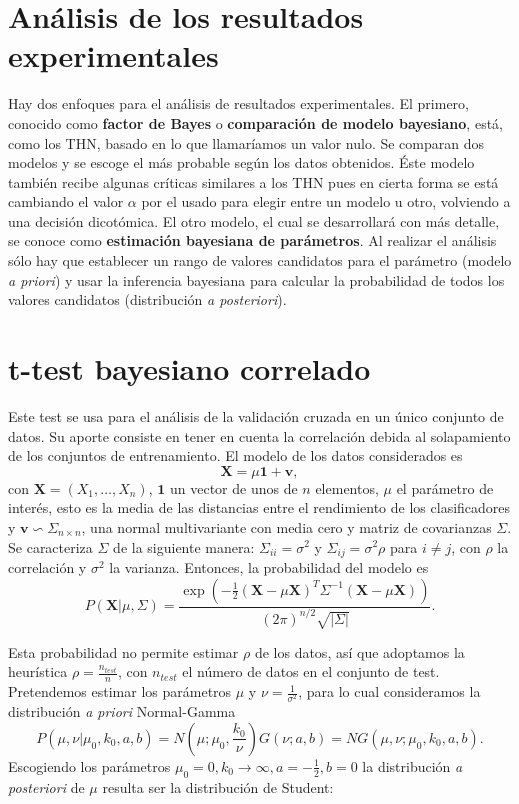 \section{Análisis de los resultados experimentales}

	Hay dos enfoques para el análisis de resultados 
experimentales. El primero, conocido como \textbf{factor de 
Bayes} o \textbf{comparación de modelo bayesiano}, está, como 
los THN, basado en lo que llamaríamos un valor nulo. Se 
comparan dos modelos y se escoge el más probable según los 
datos obtenidos. Éste modelo también recibe algunas críticas
similares a los THN pues en cierta forma se está cambiando el
valor $\alpha$ por el usado para elegir entre un modelo u 
otro, volviendo a una decisión dicotómica. El otro modelo, el 
cual se desarrollará con más detalle, se conoce como 
\textbf{estimación bayesiana de parámetros}. Al realizar
el análisis sólo hay que establecer un rango de valores 
candidatos para el parámetro (modelo \textit{a priori}) 
y usar la inferencia bayesiana para calcular la probabilidad
de todos los valores candidatos (distribución \textit{a 
posteriori}).\\

\section{t-test bayesiano correlado}
	\label{ssec:bayes-ttest}
	Este test se usa para el análisis de la validación
cruzada en un único conjunto de datos. Su aporte consiste en 
tener en cuenta la correlación debida al solapamiento de los 
conjuntos de entrenamiento. El modelo de los datos 
considerados es
	\[ \mathbf{X} = \mu \mathbf{1} + \mathbf{v}, \]
	con $\mathbf{X} = (X_1, \dots, X_n)$, $\mathbf{1}$ un 
vector de unos de $n$ elementos, $\mu$ el parámetro de
interés, esto es la media de las distancias entre el 
rendimiento de los clasificadores y $\mathbf{v} \backsim 
\Sigma_{n \times n}$, una normal multivariante con
media cero y matriz de covarianzas $\Sigma$. Se caracteriza
$\Sigma$ de la siguiente manera: $\Sigma_{ii} = \sigma^2$
y $\Sigma_{ij} = \sigma^2 \rho$ para $i \neq j$, con $\rho$
la correlación y $\sigma^2$ la varianza. Entonces,
la probabilidad del modelo es 
	\[ 
		P(\mathbf{X} | \mu, \Sigma) = 
		\frac{\exp\left(
				-\frac{1}{2}
				(\mathbf{X}-\mu\mathbf{X})^T
				\Sigma^{-1}
				(\mathbf{X}-\mu\mathbf{X})
			\right)}
		{(2\pi)^{n/2} \sqrt{|\Sigma|}}.
	\]

	Esta probabilidad no permite estimar $\rho$ de los datos, 
así que adoptamos la heurística $\rho = \frac{n_{test}}{n}$,
con $n_{test}$ el número de datos en el conjunto de test.
Pretendemos estimar los parámetros $\mu$ y $\nu = 
\frac{1}{\sigma^2}$, para lo cual consideramos la 
distribución \textit{a priori} Normal-Gamma
	\[
		P(\mu, \nu | \mu_0, k_0, a, b) =
			N\left(\mu; \mu_0, \frac{k_0}{\nu} \right)
			G(\nu; a, b) = 
			NG(\mu, \nu ; \mu_0, k_0, a, b).
	\]
	Escogiendo los parámetros $\mu_0 = 0, k_0 \rightarrow 
\infty, a = -\frac{1}{2}, b=0$ la distribución \textit{a 
posteriori} de $\mu$ resulta ser la distribución de Student:
	
